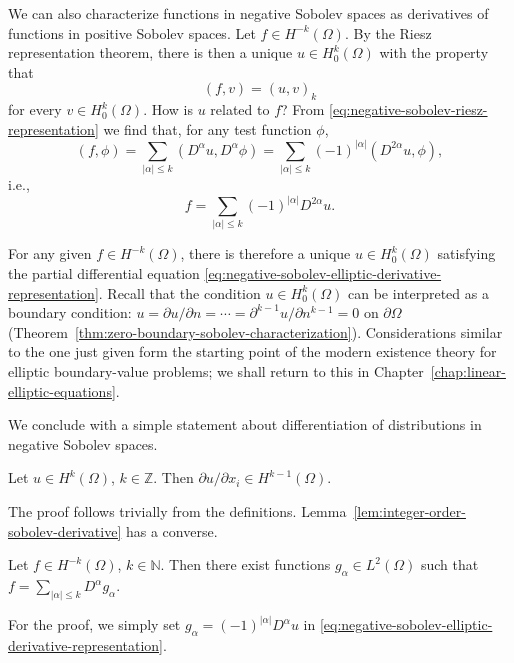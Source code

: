 We can also characterize functions in negative Sobolev spaces as derivatives of functions in positive Sobolev spaces. Let $f\in H^{-k}(\Omega)$. By the Riesz representation theorem, there is then a unique $u\in H_0^k(\Omega)$ with the property that
\begin{equation}\label{eq:negative-sobolev-riesz-representation}
(f,v)=(u,v)_k
\end{equation}
for every $v\in H_0^k(\Omega)$. How is $u$ related to $f$? From \eqref{eq:negative-sobolev-riesz-representation} we find that, for any test function $\phi$,
\begin{equation}\label{eq:negative-sobolev-riesz-derivative-pairings}
(f,\phi)=\sum_{|\alpha|\leq k}(D^\alpha u,D^\alpha\phi)=\sum_{|\alpha|\leq k}(-1)^{|\alpha|}(D^{2\alpha}u,\phi),
\end{equation}
i.e.,
\begin{equation}\label{eq:negative-sobolev-elliptic-derivative-representation}
f=\sum_{|\alpha|\leq k}(-1)^{|\alpha|}D^{2\alpha}u.
\end{equation}


For any given $f\in H^{-k}(\Omega)$, there is therefore a unique $u\in H_0^k(\Omega)$ satisfying the partial differential equation \eqref{eq:negative-sobolev-elliptic-derivative-representation}. Recall that the condition $u\in H_0^k(\Omega)$ can be interpreted as a boundary condition: $u=\partial u/\partial n=\cdots=\partial^{k-1}u/\partial n^{k-1}=0$ on $\partial\Omega$ (Theorem~\ref{thm:zero-boundary-sobolev-characterization}). Considerations similar to the one just given form the starting point of the modern existence theory for elliptic boundary-value problems; we shall return to this in Chapter~\ref{chap:linear-elliptic-equations}.

We conclude with a simple statement about differentiation of distributions in negative Sobolev spaces.

\begin{Lemma}
\label{lem:integer-order-sobolev-derivative}
Let $u\in H^k(\Omega)$, $k\in\mathbb{Z}$. Then $\partial u/\partial x_i\in H^{k-1}(\Omega)$.
\end{Lemma}

The proof follows trivially from the definitions. Lemma~\ref{lem:integer-order-sobolev-derivative} has a converse.

\begin{Lemma}
\label{lem:negative-sobolev-l-two-derivative-representation}
Let $f\in H^{-k}(\Omega)$, $k\in\mathbb{N}$. Then there exist functions $g_\alpha\in L^2(\Omega)$ such that $f=\sum_{|\alpha|\leq k}D^\alpha g_\alpha$.
\end{Lemma}

For the proof, we simply set $g_\alpha=(-1)^{|\alpha|}D^\alpha u$ in \eqref{eq:negative-sobolev-elliptic-derivative-representation}.
